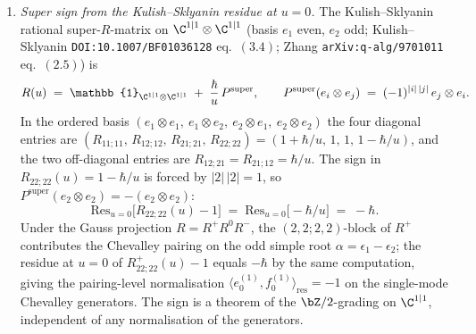 \begin{proposition}
\begin{enumerate}[label=\textup{(\roman*)}]
\begin{enumerate}[label=\textup{(R\arabic*)}]
\[ \;=\; (-1)^{|i|\,|k| + |j|}\,\delta_{il}\,\delta_{jk}\,
 [u^{-r} v^{-s}]\,\log\!\bigl(1 - \hbar/(u - v)\bigr),
 \]
 with non-degenerate log-kernel
 $\det\bigl([u^{-r} v^{-s}]\log(1 - \hbar/(u - v))\bigr)_{r, s \geq 1}
 \neq 0$ by the Vandermonde-logarithmic determinant identity of
 \textup{(}Nazarov \textit{op.~cit.} Lemma~$2.2$\textup{).} Specialisation
 $(m, n) = (1, 1)$ gives the conifold case.
 \item \emph{Arnaudon--Crampé--Doikou--Frappat--Ragoucy RTT-PBW
 basis.} Arnaudon et al.\ \texttt{arXiv:math/0503036} Theorem~$3.1$
 \textup{(}super extension of Gow \texttt{arXiv:math/0411166}
 Theorem~$1.1$ from $\mathfrak{gl}_n$ to $\mathfrak{gl}(m|n)$\textup{)}
 constructs a super PBW basis
 $\{t^{(r_1)}_{i_1 j_1} \cdots t^{(r_N)}_{i_N j_N}\}$ with matching
 dual basis in $Y^-(\mathfrak{gl}(m|n))$ under the Nazarov pairing
 of (R2); Peng \texttt{arXiv:1101.1511} \S$4$ verifies the super
 Gauss coordinates are a PBW generating set at $(m, n) = (1, 1)$.
 \end{enumerate}
 Agreement of (R1)--(R3) at charge $\gamma \leq 2$ is direct; agreement
 at all $\gamma$ follows from the super PBW basis being compatible with
 the Drinfeld super-coideal filtration \textup{(}Arnaudon et al.\
 \textit{op.~cit.} Proposition~$3.4$\textup{).}
\item \emph{Super sign from the Kulish--Sklyanin residue at $u = 0$.}
 The Kulish--Sklyanin rational super-$R$-matrix on
 $\C^{1|1} \otimes \C^{1|1}$ \textup{(}basis $e_1$ even, $e_2$ odd;
 Kulish--Sklyanin \texttt{DOI:10.1007/BF01036128} eq.~$(3.4)$;
 Zhang \texttt{arXiv:q-alg/9701011} eq.~$(2.5)$\textup{)} is
 \[
 R(u) \;=\; \mathbb{1}_{\C^{1|1} \otimes \C^{1|1}} \;+\;
 \frac{\hbar}{u}\, P^{\mathrm{super}},
 \qquad
 P^{\mathrm{super}}(e_i \otimes e_j) \;=\; (-1)^{|i|\,|j|}\,
 e_j \otimes e_i.
 \]
 In the ordered basis $(e_1 \otimes e_1,\ e_1 \otimes e_2,\
 e_2 \otimes e_1,\ e_2 \otimes e_2)$ the four diagonal entries are
 $(R_{11;11},\, R_{12;12},\, R_{21;21},\, R_{22;22}) = (1 + \hbar/u,\,
 1,\, 1,\, 1 - \hbar/u)$, and the two off-diagonal entries are
 $R_{12;21} = R_{21;12} = \hbar/u$. The sign in $R_{22;22}(u) =
 1 - \hbar/u$ is forced by $|2|\,|2| = 1$, so
 $P^{\mathrm{super}}(e_2 \otimes e_2) = -(e_2 \otimes e_2)$:
 \[
 \mathrm{Res}_{u = 0}\bigl[R_{22;22}(u) - 1\bigr] \;=\;
 \mathrm{Res}_{u = 0}\!\bigl[-\hbar/u\bigr] \;=\; -\hbar.
 \]
 Under the Gauss projection
 $R = R^+ R^0 R^-$, the $(2, 2; 2, 2)$-block of $R^+$ contributes the
 Chevalley pairing on the odd simple root $\alpha = \epsilon_1 - \epsilon_2$;
 the residue at $u = 0$ of $R^+_{22; 22}(u) - 1$ equals $-\hbar$ by the
 same computation, giving the pairing-level normalisation
 $\langle e^{(1)}_0, f^{(1)}_0\rangle_{\mathrm{res}} = -1$ on the
 single-mode Chevalley generators. The sign is a theorem of the
 $\bZ/2$-grading on $\C^{1|1}$, independent of any normalisation of
 the generators.
\end{enumerate}
\end{proposition}

